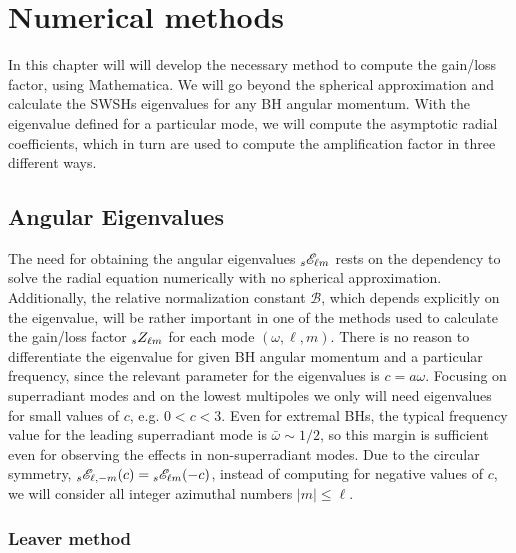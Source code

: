 
\chapter{Numerical methods} %
\label{Chapter4}

In this chapter will will develop the necessary method to compute the gain/loss factor, using Mathematica\texttrademark.
We will go beyond the spherical approximation and calculate the SWSHs eigenvalues for any BH angular momentum.
With the eigenvalue defined for a particular mode, we will compute the asymptotic radial coefficients, which in turn are used to compute the amplification factor in three different ways.


\section{Angular Eigenvalues}

The need for obtaining the angular eigenvalues $\uu[s]{\mathscr{E}}{\ell m}$ rests on the dependency to solve the radial equation numerically with no spherical approximation.
Additionally, the relative normalization constant $\mathscr{B}$, which depends explicitly on the eigenvalue, will be rather important in one of the methods used to calculate the gain/loss factor $\uu[s]{Z}{\ell m}$ for each mode $(\omega,\ell,m)$.
There is no reason to differentiate the eigenvalue for given BH angular momentum and a particular frequency, since the relevant parameter for the eigenvalues is $c=a\omega$.
Focusing on superradiant modes and on the lowest multipoles we only will need eigenvalues for small values of $c$, e.g. $0<c<3$. 
Even for extremal BHs, the typical frequency value for the leading superradiant mode is $\bar{\omega}\sim 1/2$, so this margin is sufficient even for observing the effects in non-superradiant modes.
Due to the circular symmetry, $\uu[s]{\mathscr{E}}{\ell, -m}(c) = \uu[s]{\mathscr{E}}{\ell m}(-c)$, instead of computing for negative values of $c$, we will consider all integer azimuthal numbers $|m|\le \ell$.


\subsection{Leaver method}

